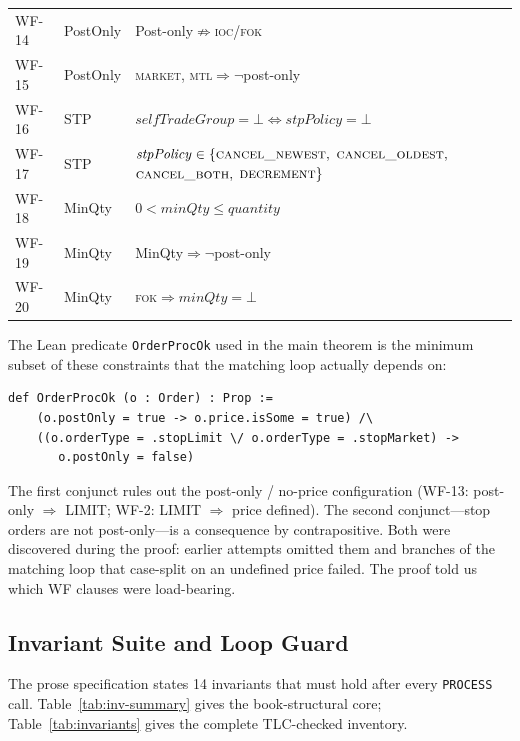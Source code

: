 \documentclass[11pt,a4paper]{article}
\begin{document}
\begin{table}[H]
\begin{tabular}{@{}llL{8cm}@{}}
WF-14      & PostOnly& Post-only$\not\Rightarrow$\textsc{ioc}/\textsc{fok} \\
WF-15      & PostOnly& \textsc{market}, \textsc{mtl}$\Rightarrow$$\neg$post-only \\
WF-16      & STP     & $\mathit{selfTradeGroup}=\bot \iff \mathit{stpPolicy}=\bot$ \\
WF-17      & STP     & $\mathit{stpPolicy}\in\{\textsc{cancel\_newest},$ $\textsc{cancel\_oldest},$ $\textsc{cancel\_both},$ $\textsc{decrement}\}$ \\
WF-18      & MinQty  & $0 < \mathit{minQty} \leq \mathit{quantity}$ \\
WF-19      & MinQty  & MinQty$\Rightarrow$$\neg$post-only \\
WF-20      & MinQty  & \textsc{fok}$\Rightarrow$$\mathit{minQty}=\bot$ \\
\bottomrule
\end{tabular}
\end{table}

The Lean predicate \texttt{OrderProcOk} used in the main theorem is the
minimum subset of these constraints that the matching loop actually
depends on:

\begin{lstlisting}[language={},basicstyle=\ttfamily\footnotesize]
def OrderProcOk (o : Order) : Prop :=
    (o.postOnly = true -> o.price.isSome = true) /\
    ((o.orderType = .stopLimit \/ o.orderType = .stopMarket) ->
       o.postOnly = false)
\end{lstlisting}

The first conjunct rules out the post-only / no-price configuration
(WF-13: post-only $\Rightarrow$ LIMIT; WF-2: LIMIT $\Rightarrow$ price
defined). The second conjunct---stop orders are not post-only---is a
consequence by contrapositive. Both were discovered during the proof:
earlier attempts omitted them and branches of the matching loop that
case-split on an undefined price failed. The proof told us which WF
clauses were load-bearing.

\subsection{Invariant Suite and Loop Guard}
\label{sec:invariants}

The prose specification states 14 invariants that must hold after every
\texttt{PROCESS} call. Table~\ref{tab:inv-summary} gives the
book-structural core; Table~\ref{tab:invariants} gives the complete
TLC-checked inventory.
\end{document}
